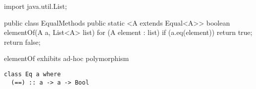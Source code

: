 \documentclass[usenames,dvipsnames,svgnames,table,aspectratio=169,mathserif]{beamer}
\begin{document}
\begin{frame}[fragile]
\begin{javacode}
import java.util.List;

public class EqualMethods {
  public static <A extends Equal<A>> boolean elementOf(A a, List<A> list) {
    for (A element : list) {
      if (a.eq(element)) return true;
    }
    return false;
  }
}
\end{javacode}

elementOf exhibits ad-hoc polymorphism

\end{frame}


\begin{frame}[fragile]
\begin{verbatim}
class Eq a where
  (==) :: a -> a -> Bool
\end{verbatim}
\end{frame}
\end{document}
